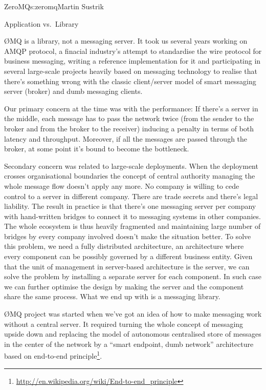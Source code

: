 \begin{aosachapter}{ZeroMQ}{s:zeromq}{Martin Sustrik}
\begin{aosasect1}{Application vs.\ Library}

{\O}MQ is a library, not a messaging server. It took us several years
working on AMQP protocol, a finacial industry's attempt to standardise
the wire protocol for business messaging, writing a reference
implementation for it and participating in several large-scale
projects heavily based on messaging technology to realise that there's
something wrong with the classic client/server model of smart
messaging server (broker) and dumb messaging clients.

Our primary concern at the time was with the performance: If there's a
server in the middle, each message has to pass the network twice (from
the sender to the broker and from the broker to the receiver) inducing
a penalty in terms of both latency and throughput. Moreover, if all
the messages are passed through the broker, at some point it's bound
to become the bottleneck.

Secondary concern was related to large-scale deployments. When the
deployment crosses organisational boundaries the concept of central
authority managing the whole message flow doesn't apply any more. No
company is willing to cede control to a server in different
company. There are trade secrets and there's legal liability. The
result in practice is that there's one messaging server per company
with hand-written bridges to connect it to messaging systems in other
companies. The whole ecosystem is thus heavily fragmented and
maintaining large number of bridges by every company involved doesn't
make the situation better. To solve this problem, we need a fully
distributed architecture, an architecture where every component can be
possibly governed by a different business entity. Given that the unit
of management in server-based architecture is the server, we can solve
the problem by installing a separate server for each component. In
such case we can further optimise the design by making the server and
the component share the same process. What we end up with is a
messaging library.

{\O}MQ project was started when we've got an idea of how to make
messaging work without a central server. It required turning the whole
concept of messaging upside down and replacing the model of autonomous
centralised store of messages in the center of the network by a
``smart endpoint, dumb network'' architecture based on end-to-end
principle\footnote{\url{http://en.wikipedia.org/wiki/End-to-end_principle}}.


\end{aosasect1}
\end{aosachapter}
